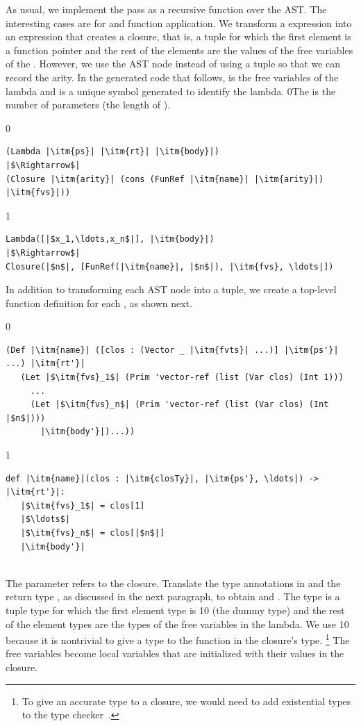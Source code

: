 \documentclass[7x10]{TimesAPriori_MIT}%
\def\racketEd{0}
\def\pythonEd{1}
\def\edition{1}
\newcommand{\racket}[1]{{\if\edition\racketEd{#1}\fi}}
\newcommand{\pythonColor}[0]{}
\newcommand{\python}[1]{{\if\edition\pythonEd\pythonColor #1\fi}}
\numberwithin{theorem}{chapter}
\numberwithin{definition}{chapter}
\numberwithin{equation}{chapter}
\begin{document}
As usual, we implement the pass as a recursive function over the
AST. The interesting cases are for  and function
application. We transform a  expression into an expression
that creates a closure, that is, a tuple for which the first element
is a function pointer and the rest of the elements are the values of
the free variables of the .
%
However, we use the  AST node instead of using a tuple
so that we can record the arity.
%
In the generated code that follows,  is the free variables of
the lambda and  is a unique symbol generated to identify the
lambda.
%
\racket{The  is the number of parameters (the length of
  \itm{ps}).}
%
{\if\edition\racketEd
\begin{lstlisting}
(Lambda |\itm{ps}| |\itm{rt}| |\itm{body}|)
|$\Rightarrow$|
(Closure |\itm{arity}| (cons (FunRef |\itm{name}| |\itm{arity}|) |\itm{fvs}|))
\end{lstlisting}
\fi}
%
{\if\edition\pythonEd\pythonColor
\begin{lstlisting}
Lambda([|$x_1,\ldots,x_n$|], |\itm{body}|)
|$\Rightarrow$|
Closure(|$n$|, [FunRef(|\itm{name}|, |$n$|), |\itm{fvs}, \ldots|])
\end{lstlisting}
\fi}
%
In addition to transforming each  AST node into a
tuple, we create a top-level function definition for each
, as shown next.\\
\begin{minipage}{0.8\textwidth}
{\if\edition\racketEd
\begin{lstlisting}
(Def |\itm{name}| ([clos : (Vector _ |\itm{fvts}| ...)] |\itm{ps'}| ...) |\itm{rt'}|
   (Let |$\itm{fvs}_1$| (Prim 'vector-ref (list (Var clos) (Int 1)))
     ...
     (Let |$\itm{fvs}_n$| (Prim 'vector-ref (list (Var clos) (Int |$n$|)))
       |\itm{body'}|)...))
\end{lstlisting}
\fi}
{\if\edition\pythonEd\pythonColor
\begin{lstlisting}
def |\itm{name}|(clos : |\itm{closTy}|, |\itm{ps'}, \ldots|) -> |\itm{rt'}|:
   |$\itm{fvs}_1$| = clos[1]
   |$\ldots$|
   |$\itm{fvs}_n$| = clos[|$n$|]
   |\itm{body'}|
\end{lstlisting}
\fi}
\end{minipage}\\
The  parameter refers to the closure.  Translate the type
annotations in  and the return type , as discussed in
the next paragraph, to obtain  and .  The type
 is a tuple type for which the first element type is
\python{}\racket{\code{\_} (the dummy type)} and the rest of
the element types are the types of the free variables in the
lambda. We use \python{}\racket{\code{\_}} because it
is nontrivial to give a type to the function in the closure's type.%
%
\footnote{To give an accurate type to a closure, we would need to add
  existential types to the type checker~\citep{Minamide:1996ys}.}
%
The free variables become local variables that are initialized with
their values in the closure.
\end{document}
